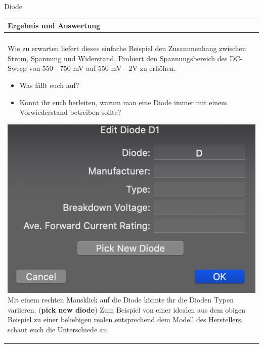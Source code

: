 \begin{frame}[t]{Diode}
  \begin{spacing}{0.9} \begin{tiny}
      \begin{table}[h!]
        \begin{tabular}{p{10cm} }
          \hline
          \textbf{Ergebnis und Auswertung} \\
          \hline                           \\
          Wie zu erwarten liefert dieses einfache Beispiel den Zusammenhang zwischen Strom, Spannung und Widerstand. Probiert den Spannungsbereich des
          DC-Sweep von 550 - 750 mV auf 550 mV - 2V zu erhöhen.
          \begin{itemize}
            \item Was fällt euch auf?
            \item Könnt ihr euch herleiten, warum man eine
                  Diode immer mit einem Vorwiederstand betreiben sollte?
          \end{itemize}
          \includegraphics[scale=0.1]{pictures/diode_choice.png} \newline
          Mit einem rechten Mausklick auf die Diode könnte ihr die Dioden Typen variieren. (\textbf{pick new diode})
          Zum Beispiel von einer idealen aus dem obigen Beispiel zu einer beliebigen realen entsprechend dem Modell des Herstellers, schaut euch die Unterschiede an.
        \end{tabular}
      \end{table}
    \end{tiny} \end{spacing}

\end{frame}